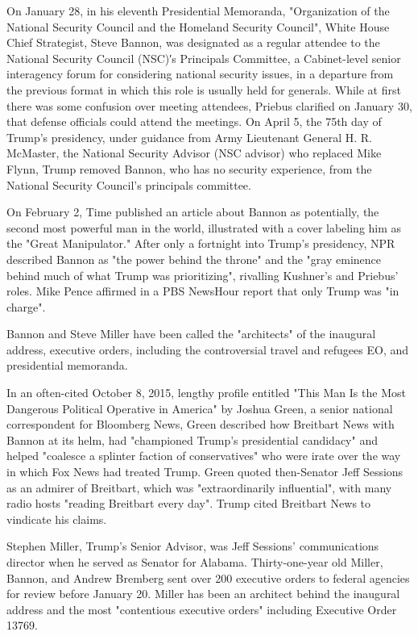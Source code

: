 On January 28, in his eleventh Presidential Memoranda, "Organization of
the National Security Council and the Homeland Security Council", White
House Chief Strategist, Steve Bannon, was designated as a regular
attendee to the National Security Council (NSC)′s Principals Committee,
a Cabinet-level senior interagency forum for considering national
security issues, in a departure from the previous format in which this
role is usually held for generals. While at first there was some
confusion over meeting attendees, Priebus clarified on January 30, that
defense officials could attend the meetings. On April 5, the 75th day of
Trump's presidency, under guidance from Army Lieutenant General H. R.
McMaster, the National Security Advisor (NSC advisor) who replaced Mike
Flynn, Trump removed Bannon, who has no security experience, from the
National Security Council's principals committee.

On February 2, Time published an article about Bannon as potentially,
the second most powerful man in the world, illustrated with a cover
labeling him as the "Great Manipulator." After only a fortnight into
Trump's presidency, NPR described Bannon as "the power behind the
throne" and the "gray eminence behind much of what Trump was
prioritizing", rivalling Kushner's and Priebus' roles. Mike Pence
affirmed in a PBS NewsHour report that only Trump was "in charge".

Bannon and Steve Miller have been called the "architects" of the
inaugural address, executive orders, including the controversial travel
and refugees EO, and presidential memoranda.

In an often-cited October 8, 2015, lengthy profile entitled "This Man Is
the Most Dangerous Political Operative in America" by Joshua Green, a
senior national correspondent for Bloomberg News, Green described how
Breitbart News with Bannon at its helm, had "championed Trump's
presidential candidacy" and helped "coalesce a splinter faction of
conservatives" who were irate over the way in which Fox News had treated
Trump. Green quoted then-Senator Jeff Sessions as an admirer of
Breitbart, which was "extraordinarily influential", with many radio
hosts "reading Breitbart every day". Trump cited Breitbart News to
vindicate his claims.

Stephen Miller, Trump's Senior Advisor, was Jeff Sessions'
communications director when he served as Senator for Alabama.
Thirty-one-year old Miller, Bannon, and Andrew Bremberg sent over 200
executive orders to federal agencies for review before January 20.
Miller has been an architect behind the inaugural address and the most
"contentious executive orders" including Executive Order 13769.

